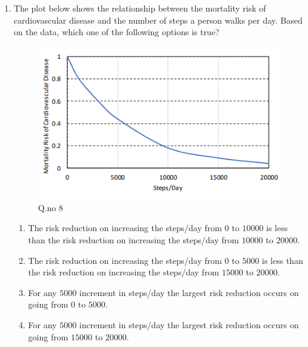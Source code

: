 \documentclass[journal,12pt,onecolumn]{IEEEtran}
\theoremstyle{remark}
\begin{document}
\begin{enumerate}
\item The plot below shows the relationship between the mortality risk of cardiovascular disease and the number of steps a person walks per day. Based on the data, which one of the following options is true?
\begin{figure}[h!]
    \centering
    \includegraphics[width=0.6\columnwidth]{figs/graph.png}
    \caption*{Q.no 8}
    \label{fig:q8}
\end{figure}
\hfill{}
\begin{enumerate}
    \item The risk reduction on increasing the steps/day from $0$ to $10000$ is less than the risk reduction on increasing the steps/day from $10000$ to $20000$.
    \item The risk reduction on increasing the steps/day from $0$ to $5000$ is less than the risk reduction on increasing the steps/day from $15000$ to $20000$.
    \item For any $5000$ increment in steps/day the largest risk reduction occurs on going from $0$ to $5000$.
    \item For any $5000$ increment in steps/day the largest risk reduction occurs on going from $15000$ to $20000$.
\end{enumerate}


\end{enumerate}
\end{document}
